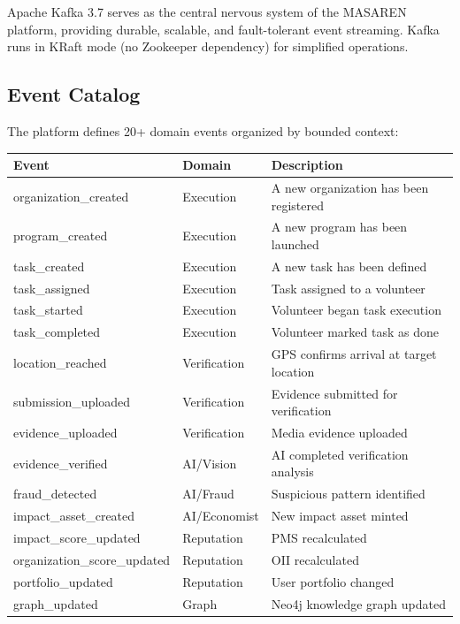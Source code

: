 \documentclass[11pt,a4paper]{article}
\begin{document}
Apache Kafka 3.7 serves as the central nervous system of the MASAREN platform, providing durable, scalable, and fault-tolerant event streaming. Kafka runs in KRaft mode (no Zookeeper dependency) for simplified operations.

\subsection{Event Catalog}

The platform defines 20+ domain events organized by bounded context:

\begin{longtable}{|p{4cm}|p{3cm}|p{6cm}|}
\hline
\textbf{Event} & \textbf{Domain} & \textbf{Description} \\
\hline
\endhead
organization\_created & Execution & A new organization has been registered \\
\hline
program\_created & Execution & A new program has been launched \\
\hline
task\_created & Execution & A new task has been defined \\
\hline
task\_assigned & Execution & Task assigned to a volunteer \\
\hline
task\_started & Execution & Volunteer began task execution \\
\hline
task\_completed & Execution & Volunteer marked task as done \\
\hline
location\_reached & Verification & GPS confirms arrival at target location \\
\hline
submission\_uploaded & Verification & Evidence submitted for verification \\
\hline
evidence\_uploaded & Verification & Media evidence uploaded \\
\hline
evidence\_verified & AI/Vision & AI completed verification analysis \\
\hline
fraud\_detected & AI/Fraud & Suspicious pattern identified \\
\hline
impact\_asset\_created & AI/Economist & New impact asset minted \\
\hline
impact\_score\_updated & Reputation & PMS recalculated \\
\hline
organization\_score\_updated & Reputation & OII recalculated \\
\hline
portfolio\_updated & Reputation & User portfolio changed \\
\hline
graph\_updated & Graph & Neo4j knowledge graph updated \\
\hline
\end{longtable}
\end{document}
